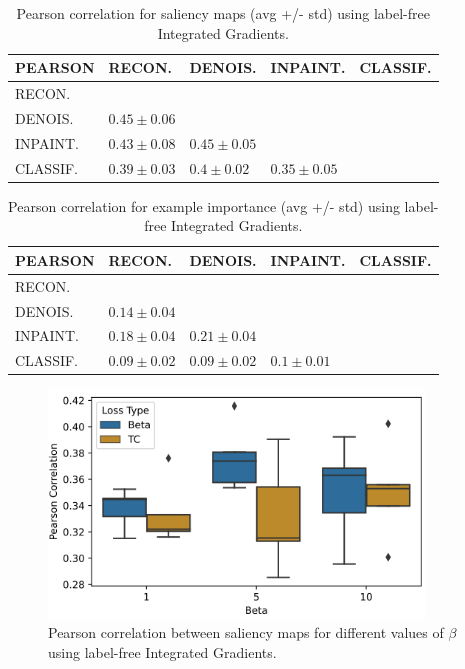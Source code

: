 \begin{table}[H]
    \centering
    \begin{tabular}{lllll}
    \hline
                   PEARSON & RECON.   & DENOIS.       & INPAINT.      & CLASSIF.   \\
    \hline
     RECON. &  &  &  &  \\
     DENOIS.      & $0.45 \pm 0.06$  &  &  &    \\
     INPAINT.     & $0.43 \pm 0.08$  & $0.45 \pm 0.05$ &    &   \\
     CLASSIF. & $0.39 \pm 0.03$  & $0.4 \pm 0.02$  & $0.35 \pm 0.05$ &    \\
    \hline
    \end{tabular}
\caption{Pearson correlation for saliency maps (avg +/- std) using label-free Integrated Gradients.}
\label{table:pretext_integrated_grads_features}
\end{table}

\begin{table}[H]
    \centering
    \begin{tabular}{lllll}
\hline
               PEARSON & RECON.   & DENOIS.       & INPAINT.      & CLASSIF.   \\
\hline
 RECON. &    & &  &   \\
 DENOIS.      & $0.14 \pm 0.04$  &    &  &   \\
 INPAINT.     & $0.18 \pm 0.04$  & $0.21 \pm 0.04$ &    &    \\
 CLASSIF. & $0.09 \pm 0.02$  & $0.09 \pm 0.02$ & $0.1 \pm 0.01$  &     \\
\hline
\end{tabular}
\caption{Pearson correlation for example importance (avg +/- std) using label-free Integrated Gradients.}
\label{table:pretext_integrated_grads_examples}
\end{table}

\begin{figure}[H]
    \centering
    \includegraphics[width=10cm]{images/vae_integrated_grads.png}
    \caption{Pearson correlation between saliency maps for different values of \(\beta\) using label-free Integrated Gradients.}
    \label{fig:vae_integrated_grads_quantitative}
\end{figure}

